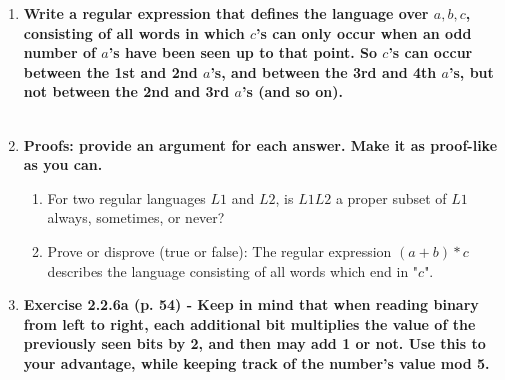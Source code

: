 \begin{enumerate}
\newpage
\item \textbf{Write a regular expression that defines the language over
  ${a,b,c}$, consisting of all words in which $c$'s can only occur when an odd
  number of $a$'s have been seen up to that point. So $c$'s can occur between the 1st and 2nd $a$'s, and between the 3rd and 4th $a$'s, but not between the 2nd and 3rd $a$'s (and so on).}
\\\\


\newpage
\item \textbf{Proofs: provide an argument for each answer. Make it as
  proof-like as you can.}
\begin{enumerate}
  \item For two regular languages $L1$ and $L2$, is $L1L2$ a proper subset of
    $L1$ always, sometimes, or never?
  \item Prove or disprove (true or false): The regular expression $(a+b)*c$
    describes the language consisting of all words which end in "$c$".
\end{enumerate}

\newpage
\item \textbf{Exercise 2.2.6a (p. 54) - Keep in mind that when reading binary
  from left to right, each additional bit multiplies the value of the
  previously seen bits by 2, and then may add 1 or not. Use this to your
  advantage, while keeping track of the number's value mod 5.}
\\\\


\end{enumerate}


